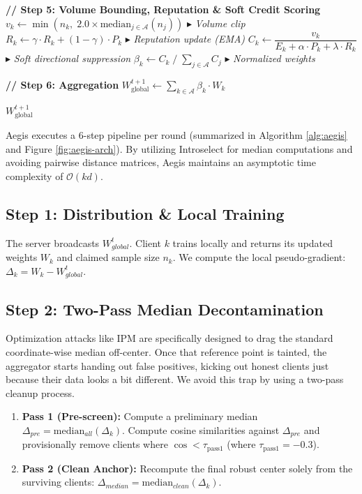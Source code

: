 \documentclass[10pt, conference]{IEEEtran}
\begin{document}
\begin{algorithm}[htbp]
\begin{algorithmic}[1]
\STATE

\STATE \textbf{// Step 5: Volume Bounding, Reputation \& Soft Credit Scoring}
    \STATE $v_k \leftarrow \min(n_k,\; 2.0 \times \text{median}_{j \in \mathcal{A}}(n_j))$ \hfill $\blacktriangleright$ \textit{Volume clip}
    \STATE $R_k \leftarrow \gamma \cdot R_k + (1 - \gamma) \cdot P_k$ \hfill $\blacktriangleright$ \textit{Reputation update (EMA)}
    \STATE $C_k \leftarrow \dfrac{v_k}{E_k + \alpha \cdot P_k + \lambda \cdot R_k}$ \hfill $\blacktriangleright$ \textit{Soft directional suppression}
\ENDFOR
\STATE $\beta_k \leftarrow C_k \;/\; \sum_{j \in \mathcal{A}} C_j$ \hfill $\blacktriangleright$ \textit{Normalized weights}

\STATE

\STATE \textbf{// Step 6: Aggregation}
\STATE $W^{t+1}_{\text{global}} \leftarrow \sum_{k \in \mathcal{A}} \beta_k \cdot W_k$

\RETURN $W^{t+1}_{\text{global}}$

\end{algorithmic}
\end{algorithm}

Aegis executes a 6-step pipeline per round (summarized in Algorithm \ref{alg:aegis} and Figure \ref{fig:aegis-arch}). By utilizing Introselect for median computations and avoiding pairwise distance matrices, Aegis maintains an asymptotic time complexity of $\mathcal{O}(kd)$.

\subsection{Step 1: Distribution \& Local Training}
The server broadcasts $W_{global}^t$. Client $k$ trains locally and returns its updated weights $W_k$ and claimed sample size $n_k$. We compute the local pseudo-gradient: $\Delta_k = W_k - W_{global}^t$.

\subsection{Step 2: Two-Pass Median Decontamination}
Optimization attacks like IPM are specifically designed to drag the standard coordinate-wise median off-center. Once that reference point is tainted, the aggregator starts handing out false positives, kicking out honest clients just because their data looks a bit different. We avoid this trap by using a two-pass cleanup process.
\begin{enumerate}
    \item \textbf{Pass 1 (Pre-screen):} Compute a preliminary median $\Delta_{pre} = \text{median}_{all}(\Delta_k)$. Compute cosine similarities against $\Delta_{pre}$ and provisionally remove clients where $\cos < \tau_{\text{pass1}}$ (where $\tau_{\text{pass1}} = -0.3$).
    \item \textbf{Pass 2 (Clean Anchor):} Recompute the final robust center solely from the surviving clients: $\Delta_{median} = \text{median}_{clean}(\Delta_k)$.
\end{enumerate}
\end{document}
